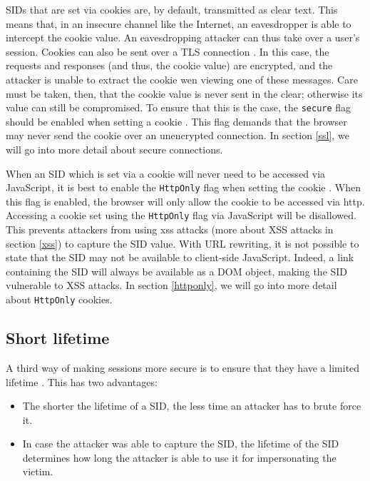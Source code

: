 \label{secure-flag}SIDs that are set via cookies are, by default, transmitted as clear text. This means that, in an insecure channel like the Internet, an eavesdropper is able to intercept the cookie value. An eavesdropping attacker can thus take over a user's session. Cookies can also be sent over a TLS connection \cite{rfc2246}. In this case, the requests and responses (and thus, the cookie value) are encrypted, and the attacker is unable to extract the cookie wen viewing one of these messages. Care must be taken, then, that the cookie value is never sent in the clear; otherwise its value can still be compromised. To ensure that this is the case, the \texttt{secure} flag should be enabled when setting a cookie \cite{Fu2001, rfc2109}. This flag demands that the browser may never send the cookie over an unencrypted connection. In section \ref{ssl}, we will go into more detail about secure connections.

When an SID which is set via a cookie will never need to be accessed via JavaScript, it is best to enable the \texttt{HttpOnly} flag when setting the cookie \cite{Nikiforakis2010}. When this flag is enabled, the browser will only allow the cookie to be accessed via \gls{http}. Accessing a cookie set using the \texttt{HttpOnly} flag via JavaScript will be disallowed. This prevents attackers from using \gls{xss} attacks (more about XSS attacks in section \ref{xss}) to capture the SID value. With URL rewriting, it is not possible to state that the SID may not be available to client-side JavaScript. Indeed, a link containing the SID will always be available as a DOM object, making the SID vulnerable to XSS attacks. In section \ref{httponly}, we will go into more detail about \texttt{HttpOnly} cookies.

\subsection{Short lifetime}
A third way of making sessions more secure is to ensure that they have a limited lifetime \cite{Fu2001}. This has two advantages:
\begin{itemize}
	\item The shorter the lifetime of a SID, the less time an attacker has to brute force it.
	\item In case the attacker was able to capture the SID, the lifetime of the SID determines how long the attacker is able to use it for impersonating the victim.
\end{itemize}

